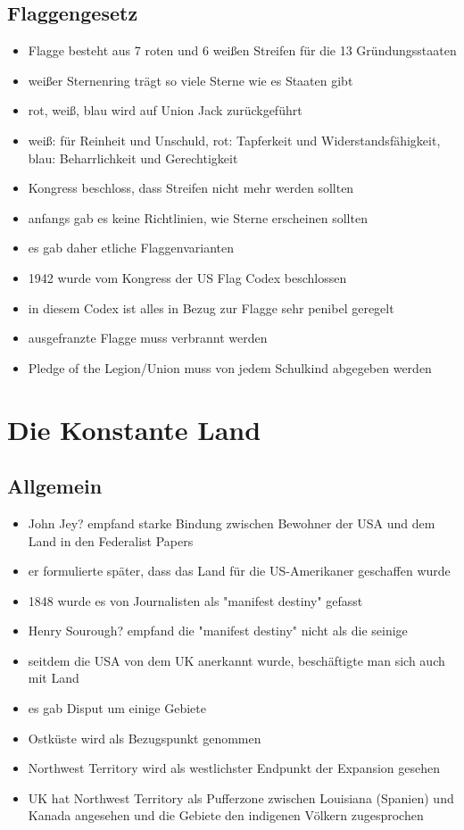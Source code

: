 \documentclass[10pt,a4paper,oneside,ngerman,numbers=noenddot]{scrartcl}
\newenvironment{myitemize}{\begin{itemize}\itemsep -8pt}{\end{itemize}} %
\begin{document}
\subsection*{Flaggengesetz}
\begin{myitemize}
    \item Flagge besteht aus 7 roten und 6 weißen Streifen für die 13 Gründungsstaaten
    \item weißer Sternenring trägt so viele Sterne wie es Staaten gibt
    \item rot, weiß, blau wird auf Union Jack zurückgeführt
    \item weiß: für Reinheit und Unschuld, rot: Tapferkeit und Widerstandsfähigkeit, blau: Beharrlichkeit und Gerechtigkeit
    \item Kongress beschloss, dass Streifen nicht mehr werden sollten
    \item anfangs gab es keine Richtlinien, wie Sterne erscheinen sollten
    \item es gab daher etliche Flaggenvarianten
    \item 1942 wurde vom Kongress der US Flag Codex beschlossen
    \item in diesem Codex ist alles in Bezug zur Flagge sehr penibel geregelt
    \item ausgefranzte Flagge muss verbrannt werden
    \item Pledge of the Legion/Union muss von jedem Schulkind abgegeben werden
\end{myitemize}

\section*{Die Konstante Land}
\subsection*{Allgemein}
\begin{myitemize}
    \item John Jey? empfand starke Bindung zwischen Bewohner der USA und dem Land in den Federalist Papers
    \item er formulierte später, dass das Land für die US-Amerikaner geschaffen wurde
    \item 1848 wurde es von Journalisten als "manifest destiny" gefasst
    \item Henry Sourough? empfand die "manifest destiny" nicht als die seinige
    \item seitdem die USA von dem UK anerkannt wurde, beschäftigte man sich auch mit Land
    \item es gab Disput um einige Gebiete
    \item Ostküste wird als Bezugspunkt genommen
    \item Northwest Territory wird als westlichster Endpunkt der Expansion gesehen
    \item UK hat Northwest Territory als Pufferzone zwischen Louisiana (Spanien) und Kanada
          angesehen und die Gebiete den indigenen Völkern zugesprochen
\end{myitemize}
\end{document}
